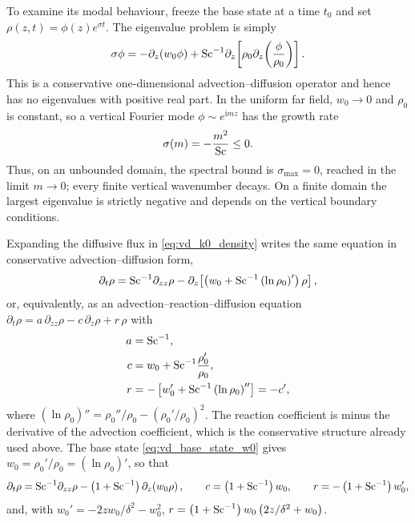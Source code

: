To examine its modal behaviour, freeze the base state at a time \(t_0\) and set
\(\rho(z,t)=\phi(z)e^{\sigma t}\). The eigenvalue problem is simply
\begin{equation}
  \sigma\phi
  =-\partial_z(w_0\phi)
  +\mathrm{Sc}^{-1}\partial_z\!\left[
    \rho_0\partial_z\!\left(\frac{\phi}{\rho_0}\right)
  \right].
  \label{eq:vd_k0_eigenvalue_problem}
\end{equation}
This is a conservative one-dimensional advection--diffusion operator and hence
has no eigenvalues with positive real part. In the uniform far field,
\(w_0\to0\) and \(\rho_0\) is constant, so a vertical Fourier mode
\(\phi\sim e^{\mathrm{i}mz}\) has the growth rate
\begin{equation}
  \sigma(m)=-\frac{m^2}{\mathrm{Sc}}\leq0.
  \label{eq:vd_k0_growth_rate}
\end{equation}
Thus, on an unbounded domain, the spectral bound is \(\sigma_{\max}=0\), reached
in the limit \(m\to0\); every finite vertical wavenumber decays. On a finite
domain the largest eigenvalue is strictly negative and depends on the vertical
boundary conditions.

Expanding the diffusive flux in \eqref{eq:vd_k0_density} writes the same
equation in conservative advection--diffusion form,
\begin{equation}
  \partial_t\rho
  =
  \mathrm{Sc}^{-1}\partial_{zz}\rho
  -
  \partial_z\!\left[
    \left(w_0+\mathrm{Sc}^{-1}\left(\ln\rho_0\right)'\right)\rho
  \right],
  \label{eq:vd_k0_conservative_form}
\end{equation}
or, equivalently, as an advection--reaction--diffusion equation
\(\partial_t\rho=a\,\partial_{zz}\rho-c\,\partial_z\rho+r\,\rho\) with
\begin{subequations}
  \label{eq:vd_k0_ard_coefficients}
  \begin{align}
    a &= \mathrm{Sc}^{-1},
    \label{eq:vd_k0_ard_a}\\
    c &= w_0+\mathrm{Sc}^{-1}\frac{\rho_0'}{\rho_0},
    \label{eq:vd_k0_ard_c}\\
    r &= -\left[w_0'+\mathrm{Sc}^{-1}\left(\ln\rho_0\right)''\right]=-c',
    \label{eq:vd_k0_ard_r}
  \end{align}
\end{subequations}
where \(\left(\ln\rho_0\right)''=\rho_0''/\rho_0-\left(\rho_0'/\rho_0\right)^2\).
The reaction coefficient is minus the derivative of the advection coefficient,
which is the conservative structure already used above. The base state
\eqref{eq:vd_base_state_w0} gives \(w_0=\rho_0'/\rho_0=\left(\ln\rho_0\right)'\),
so that
\begin{equation}
  \partial_t\rho
  =
  \mathrm{Sc}^{-1}\partial_{zz}\rho
  -
  \left(1+\mathrm{Sc}^{-1}\right)\partial_z\!\left(w_0\rho\right),
  \qquad
  c=\left(1+\mathrm{Sc}^{-1}\right)w_0,
  \qquad
  r=-\left(1+\mathrm{Sc}^{-1}\right)w_0' ,
  \label{eq:vd_k0_ard_base_state}
\end{equation}
and, with \(w_0'=-2zw_0/\delta^{2}-w_0^{2}\),
\(r=\left(1+\mathrm{Sc}^{-1}\right)w_0\left(2z/\delta^{2}+w_0\right)\).

